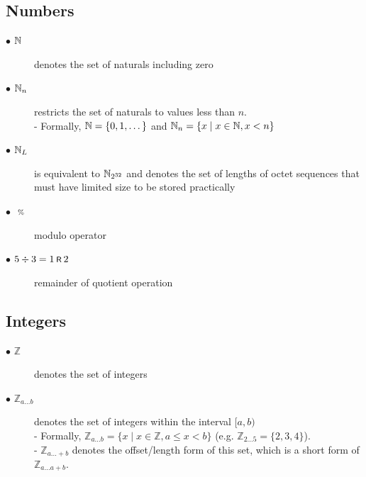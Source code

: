 \subsection{Numbers}\label{sec:numbers}
\begin{description}
  \item[$\bullet$ $\mathbb{N}$] denotes the set of naturals including zero
  \item[$\bullet$ $\mathbb{N}_n$] restricts the set of naturals to values less than $n$.
    \\ - Formally, $\mathbb{N} = \{0, 1, \dots \}$ and $\mathbb{N}_n = \{ x \mid x \in \mathbb{N}, x < n \}$
  \item[$\bullet$ $\mathbb{N}_L$] is equivalent to $\mathbb{N}_{2^{32}}$ and denotes the set of lengths
  of octet sequences that must have limited size to be stored practically
  \item[$\bullet$ $\ \text{\scriptsize{\%}}\ $] modulo operator
  \item[$\bullet$ $5 \div 3 = 1 \text{\hspace{2pt}\footnotesize{\textsf{R}}\hspace{2pt}} 2$] remainder of quotient operation
\end{description}

\subsection{Integers}\label{sec:integers}
\begin{description}
  \item[$\bullet$ $\mathbb{Z}$] denotes the set of integers
  \item[$\bullet$ $\mathbb{Z}_{a \dots b}$] denotes the set of integers within the interval $[a, b)$
    \\ - Formally, $\mathbb{Z}_{a \dots b} = \{ x \mid x \in \mathbb{Z}, a \le x < b \}$ (e.g. $\mathbb{Z}_{2 \dots 5} = \{ 2, 3, 4 \}$).
    \\ - $\mathbb{Z}_{a \dots +b}$ denotes the offset/length form of this set, which is a short form of $\mathbb{Z}_{a \dots a+b}$.
\end{description}



